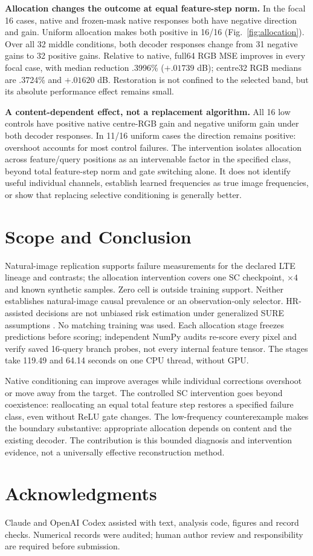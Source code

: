 \textbf{Allocation changes the outcome at equal feature-step norm.}
In the focal 16 cases, native and frozen-mask native responses both have
negative direction and gain. Uniform allocation makes both positive in
16/16 (Fig.~\ref{fig:allocation}). Over all 32 middle conditions, both
decoder responses change from 31 negative gains to 32 positive gains.
Relative to native, full64 RGB MSE improves in every focal case, with
median reduction .3996\% ($+.01739$ dB); centre32 RGB medians are
.3724\% and $+.01620$ dB.
Restoration is not confined to the selected band, but its absolute
performance effect remains small.

\textbf{A content-dependent effect, not a replacement algorithm.}
All 16 low controls have positive native centre-RGB gain and negative
uniform gain under both decoder responses. In 11/16 uniform cases the
direction remains positive: overshoot accounts for most control failures.
The intervention isolates allocation across feature/query positions as
an intervenable factor in the specified class, beyond total feature-step
norm and gate switching alone. It does not identify useful individual
channels, establish learned frequencies as true image frequencies, or
show that replacing selective conditioning is generally better.

\section{Scope and Conclusion}
\label{sec:limits}
Natural-image replication supports failure measurements for the declared
LTE lineage and contrasts; the allocation intervention covers one SC
checkpoint, $\times4$ and known synthetic samples. Zero cell is outside
training support. Neither establishes natural-image causal prevalence or
an observation-only selector. HR-assisted decisions are not unbiased risk
estimation under generalized SURE assumptions \cite{eldar2008gsure}.
No matching training was used.
Each allocation stage freezes predictions before scoring; independent
NumPy audits re-score every pixel and verify saved 16-query branch probes,
not every internal feature tensor. The stages take 119.49 and 64.14 seconds
on one CPU thread, without GPU.

Native conditioning can improve averages while individual corrections
overshoot or move away from the target. The controlled SC intervention
goes beyond coexistence: reallocating an equal total feature step restores
a specified failure class, even without ReLU gate changes.
The low-frequency counterexample makes the boundary substantive:
appropriate allocation depends on content and the existing decoder.
The contribution is this bounded diagnosis and intervention evidence,
not a universally effective reconstruction method.

\newpage
\section{Acknowledgments}
Claude and OpenAI Codex assisted with text, analysis code, figures and
record checks. Numerical records were audited; human author review and
responsibility are required before submission.

